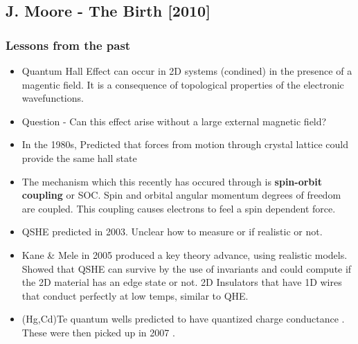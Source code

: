 \documentclass[../mattg_ti-fii_lit-review.tex]{subfiles}
\begin{document}
	\subsection{J. Moore - The Birth\cite{moore_birth_2010} [2010]}
	\subsubsection{Lessons from the past}
	\begin{itemize}
		\item Quantum Hall Effect can occur in 2D systems (condined) in the presence of a magentic field. It is a consequence of topological properties of the electronic wavefunctions. 
		\item Question - Can this effect arise without a large external magnetic field?
		\item In the 1980s, Predicted that forces from motion through crystal lattice could provide the same hall state \cite{haldane_model_1988}
		\item The mechanism which this recently has occured through is \textbf{spin-orbit coupling} or SOC. Spin and orbital angular momentum degrees of freedom are coupled. This coupling causes electrons to feel a spin dependent force.
		\item QSHE predicted in 2003. Unclear how to measure or if realistic or not. \cite{murakami_dissipationless_2003, murakami_spin-hall_2004}
		\item Kane \& Mele in 2005 produced a key theory advance, using realistic models. Showed that QSHE can survive by the use of invariants and could compute if the 2D material has an edge state or not. 2D Insulators that have 1D wires that conduct perfectly at low temps, similar to QHE. \cite{kane_z_2005}
		\item (Hg,Cd)Te quantum wells predicted to have quantized charge conductance  \cite{bernevig_quantum_2006}. These were then picked up in 2007 \cite{konig_quantum_2007}.
	\end{itemize}
\end{document}
